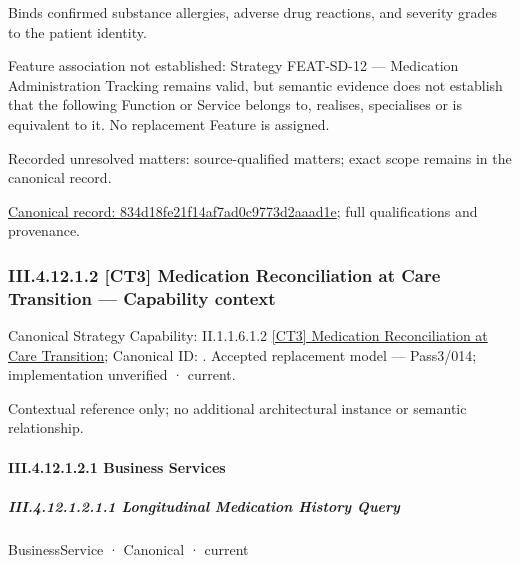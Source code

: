 Binds confirmed substance allergies, adverse drug reactions, and severity grades to the patient identity.



Feature association not established: Strategy FEAT-SD-12 — Medication Administration Tracking remains valid, but semantic evidence does not establish that the following Function or Service belongs to, realises, specialises or is equivalent to it. No replacement Feature is assigned.


{\small Recorded unresolved matters: source-qualified matters; exact scope remains in the canonical record.}\par
{\footnotesize \href{../../../../continuum/business/business-function/834d18fe21f14af7ad0c9773d2aaad1e.md}{Canonical record: 834d18fe21f14af7ad0c9773d2aaad1e}; full qualifications and provenance.}\par
\subsubsection*{III.4.12.1.2 [CT3] Medication Reconciliation at Care Transition — Capability context}
\label{navigation:III.4.12.1.2}

{\small Canonical Strategy Capability: II.1.1.6.1.2 \hyperref[element:f7b8e469f8834d3ebdf6451f489310e9]{[CT3] Medication Reconciliation at Care Transition}; Canonical ID: \texttt{}. Accepted replacement model — Pass3/014; implementation unverified · current.}\par
Contextual reference only; no additional architectural instance or semantic relationship.\par
\paragraph*{III.4.12.1.2.1 Business Services}
\label{navigation:III.4.12.1.2.1}

\subparagraph*{III.4.12.1.2.1.1 Longitudinal Medication History Query}
\label{navigation:III.4.12.1.2.1.1}

\label{element:6a42771bbe5449ab87e8ece94519d03d}
{\small BusinessService · Canonical · current}\par

